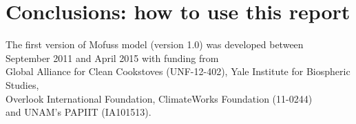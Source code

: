 \documentclass[english,a4paper,11pt,twoside]{report}
\begin{document}
\chapter{Conclusions: how to use this report}
\begin{flushleft}
	\blindtext[3]
\end{flushleft}
\FloatBarrier

%
% 
\listoffigures
\listoftables

\newpage
\pagestyle{empty}
\vspace*{\fill}
\begin{center}
	The first version of Mofuss model (version 1.0) was developed between\\
	September 2011 and April 2015 with funding from\\
	Global Alliance for Clean Cookstoves (UNF-12-402), Yale Institute for Biospheric Studies,\\ 
	Overlook International Foundation, ClimateWorks Foundation (11-0244)\\ 
	and UNAM’s PAPIIT (IA101513).	
	\label{lastpage}
\end{center}
\vspace*{\fill}
\end{document}
